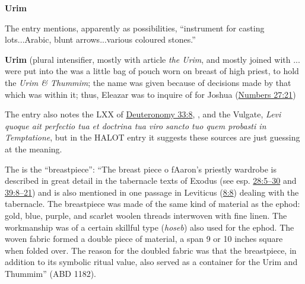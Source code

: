 				\begin{compactdesc}
					\item[HALOT 25a, PDF 82] \textbf{} %
						\begin{compactitem}
							\item \textbf{Urim}
								\begin{compactitem}
									\item The entry mentions, apparently as possibilities, ``instrument for casting lots...Arabic, blunt arrows...various coloured stones.''
								\end{compactitem}
						\end{compactitem}
					\item[BDB 22a, PDF 41] \textbf{}
						\begin{compactitem}
							\item \textbf{Urim} (plural intensifier, mostly with article \textit{the Urim}, and mostly joined with ... were put into the  was a little bag of pouch worn on breast of high priest, to hold the \textit{Urim \& Thummim}; the name  was given because of decisions made by that which was within it; thus, Eleazar was to inquire of  for Joshua  (\hyperref[NUMBERS-27-21]{Numbers 27:21})
								\begin{compactitem}
									\item The entry also notes the LXX of \hyperref[DEUTERONOMY-33-8]{Deuteronomy 33:8}, , and the Vulgate, \textit{Levi quoque ait perfectio tua et doctrina tua viro sancto tuo quem probasti in Temptatione}, but in the HALOT entry it suggests these sources are just guessing at the meaning.
									\item The  is the ``breastpiece'': ``The breast piece o fAaron's priestly wardrobe is described in great detail in the tabernacle texts of Exodus (see esp. \hyperref[EXODUS-28-5]{28:5--30} and \hyperref[EXODUS-39-8]{39:8--21}) and is also mentioned in one passage in Leviticus (\hyperref[LEVITICUS-8-8]{8:8}) dealing with the tabernacle. The breastpiece was made of the same kind of material as the ephod: gold, blue, purple, and scarlet woolen threads interwoven with fine linen. The workmanship was of a certain skillful type (\textit{hoseb}) also used for the ephod. The woven fabric formed a double piece of material, a span 9 or 10 inches square when folded over. The reason for the doubled fabric was that the breastpiece, in addition to its symbolic ritual value, also served as a container for the Urim and Thummim'' (ABD 1182).

\end{compactitem}
\end{compactitem}
\end{compactdesc}
